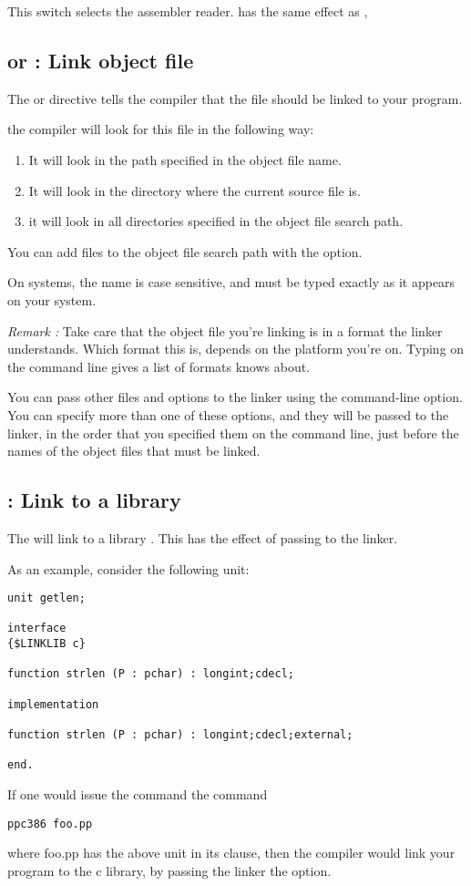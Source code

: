 \documentclass{report}
\begin{document}
This switch selects the assembler reader. 
has the same effect as , 

\subsection{ or  : Link object file}
The  or  directive
tells the compiler that the file  should be linked to
your program.

the compiler will look for this file in the following way:

\begin{enumerate}
\item It will look in the path specified in the object file name.
\item It will look in the directory where the current source file is.
\item it will look in all directories specified in the object file search path.
\end{enumerate}
You can add files to the object file search path with the 
option.

On \linux systems, the name is case sensitive, and must be typed
exactly as it appears on your system.

{\em Remark :} Take care that the object file you're linking is in a
format the linker understands. Which format this is, depends on the platform
you're on. Typing  on the command line gives a list of formats
 knows about.

You can pass other files and options to the linker using the 
command-line option. You can specify more than one of these options, and
they will be passed to the linker, in the order that you specified them on
the command line, just before the names of the object files that must be
linked.

\subsection{ : Link to a library}
The  will link to a library .
This has the effect of passing  to the linker.

As an example, consider the following unit:
\begin{verbatim}
unit getlen;

interface
{$LINKLIB c}

function strlen (P : pchar) : longint;cdecl;

implementation

function strlen (P : pchar) : longint;cdecl;external;

end.
\end{verbatim}
If one would issue the command the command
\begin{verbatim}
ppc386 foo.pp
\end{verbatim}
where foo.pp has the above unit in its  clause,
then the compiler would link your program to the c library, by passing the
linker the  option.
\end{document}
